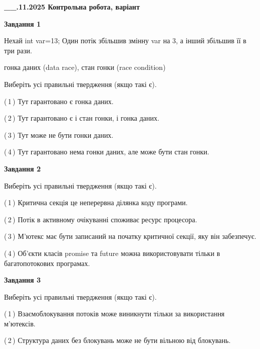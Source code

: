 \documentclass[12pt, ukrainian]{article}
\begin{document}
\begin {large}

\textbf{\_\_.11.2025 Контрольна робота, варіант  }\par


{

\begin{center}
\textbf{Завдання 1}
\end{center}
Нехай int var=13; Один потік збільшив змінну var на 3, а інший збільшив її в три рази.

гонка даних (data race), стан гонки (race condition)

Виберіть усі правильні твердження (якщо такі є).\par
\vspace{2mm}
(\,1\,) Тут гарантовано є гонка даних.%

(\,2\,) Тут гарантовано є і стан гонки, і гонка даних.%

(\,3\,) Тут може не бути гонки даних.%

(\,4\,) Тут гарантовано нема гонки даних, але може бути стан гонки.%



\begin{center}
\textbf{Завдання 2}
\end{center}
Виберіть усі правильні твердження (якщо такі є).\par
\vspace{2mm}

(\,1\,) Критична секція це неперервна ділянка коду програми.%

(\,2\,) Потік в активному очікуванні споживає ресурс процесора.%

(\,3\,) М’ютекс має бути записаний на початку критичної секції, яку він забезпечує.%

(\,4\,) Об’єкти класів promise та future можна використовувати тільки в багатопотокових програмах.%



\begin{center}
\textbf{Завдання 3}
\end{center}
Виберіть усі правильні твердження (якщо такі є).\par
\vspace{2mm}

(\,1\,) Взаємоблокування потоків може виникнути тільки за використання м’ютексів.%

(\,2\,) Структура даних без блокувань може не бути вільною від блокувань.%

}
\end{large}
\end{document}
